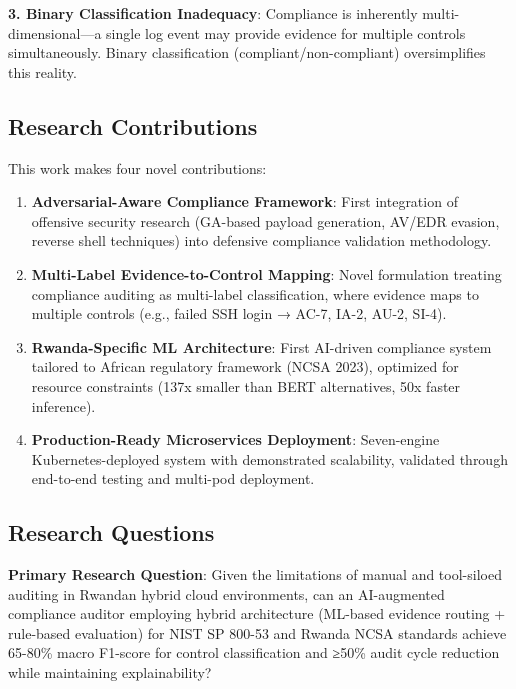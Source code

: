 \documentclass[11pt,conference]{IEEEtran}
\begin{document}
\textbf{3. Binary Classification Inadequacy}: Compliance is inherently multi-dimensional—a single log event may provide evidence for multiple controls simultaneously. Binary classification (compliant/non-compliant) oversimplifies this reality.

\subsection{Research Contributions}

This work makes four novel contributions:

\begin{enumerate}
    \item \textbf{Adversarial-Aware Compliance Framework}: First integration of offensive security research (GA-based payload generation, AV/EDR evasion, reverse shell techniques) into defensive compliance validation methodology.

    \item \textbf{Multi-Label Evidence-to-Control Mapping}: Novel formulation treating compliance auditing as multi-label classification, where evidence maps to multiple controls (e.g., failed SSH login → AC-7, IA-2, AU-2, SI-4).

    \item \textbf{Rwanda-Specific ML Architecture}: First AI-driven compliance system tailored to African regulatory framework (NCSA 2023), optimized for resource constraints (137x smaller than BERT alternatives, 50x faster inference).

    \item \textbf{Production-Ready Microservices Deployment}: Seven-engine Kubernetes-deployed system with demonstrated scalability, validated through end-to-end testing and multi-pod deployment.
\end{enumerate}

\subsection{Research Questions}

\textbf{Primary Research Question}:
Given the limitations of manual and tool-siloed auditing in Rwandan hybrid cloud environments, can an AI-augmented compliance auditor employing hybrid architecture (ML-based evidence routing + rule-based evaluation) for NIST SP 800-53 and Rwanda NCSA standards achieve 65-80\% macro F1-score for control classification and ≥50\% audit cycle reduction while maintaining explainability?
\end{document}
